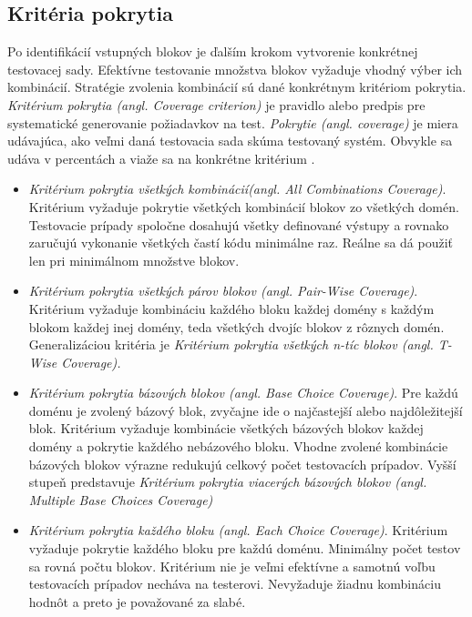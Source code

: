 \subsection*{Kritéria pokrytia}
Po identifikácií vstupných blokov je ďalším krokom vytvorenie konkrétnej testovacej sady. Efektívne testovanie množstva blokov vyžaduje vhodný výber ich kombinácií. Stratégie zvolenia kombinácií sú dané konkrétnym kritériom pokrytia. \textit{Kritérium pokrytia (angl. Coverage criterion)} je pravidlo alebo predpis pre systematické generovanie požiadavkov na test. \textit{Pokrytie (angl. coverage)} je miera udávajúca, ako veľmi daná testovacia sada skúma testovaný systém. Obvykle sa udáva v percentách a viaže sa na konkrétne kritérium \cite{Ist}.     
\begin{itemize}
	\item{ \textit{Kritérium pokrytia všetkých kombinácií(angl. All Combinations Coverage)}. Kritérium vyžaduje pokrytie všetkých kombinácií blokov zo všetkých domén. Testovacie prípady spoločne dosahujú všetky definované výstupy a rovnako zaručujú vykonanie všetkých častí kódu minimálne raz. Reálne sa dá použiť len pri minimálnom množstve blokov.
	}
	\item{ \textit{Kritérium pokrytia všetkých párov blokov (angl.  Pair-Wise Coverage)}. Kritérium vyžaduje kombináciu každého bloku každej domény s každým blokom každej inej domény, teda všetkých dvojíc blokov z rôznych domén. Generalizáciou kritéria je \textit{Kritérium pokrytia všetkých n-tíc blokov (angl. T-Wise Coverage).}  
	}
	\item{ \textit{Kritérium pokrytia bázových blokov (angl. Base Choice Coverage)}. Pre každú doménu je zvolený bázový blok,  zvyčajne ide o najčastejší alebo najdôležitejší blok. Kritérium vyžaduje kombinácie všetkých bázových blokov každej domény a pokrytie každého nebázového bloku. Vhodne zvolené kombinácie bázových blokov výrazne redukujú celkový počet testovacích prípadov. Vyšší stupeň predstavuje \textit{Kritérium pokrytia viacerých bázových blokov (angl. Multiple Base Choices Coverage)} 
	} 	
	\item{ \textit{Kritérium pokrytia každého bloku (angl. Each Choice Coverage)}. Kritérium vyžaduje pokrytie každého bloku pre každú doménu. Minimálny počet testov sa rovná počtu blokov. Kritérium nie je veľmi efektívne a samotnú voľbu testovacích prípadov necháva na testerovi. Nevyžaduje žiadnu kombináciu hodnôt a preto je považované za slabé.
	}
\end{itemize}


